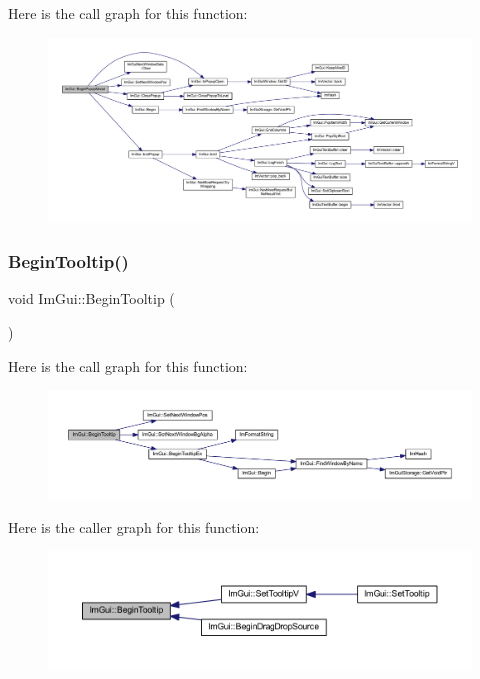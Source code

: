 Here is the call graph for this function\+:
\nopagebreak
\begin{figure}[H]
\begin{center}
\leavevmode
\includegraphics[width=350pt]{namespace_im_gui_a6d840f615c198c2342968f733fda11b3_cgraph}
\end{center}
\end{figure}
\mbox{\label{namespace_im_gui_a36816a48385f4759d746a03cf6202512}} 
\subsubsection{\texorpdfstring{Begin\+Tooltip()}{BeginTooltip()}}
{\footnotesize\ttfamily void Im\+Gui\+::\+Begin\+Tooltip (\begin{DoxyParamCaption}{ }\end{DoxyParamCaption})}

Here is the call graph for this function\+:
\nopagebreak
\begin{figure}[H]
\begin{center}
\leavevmode
\includegraphics[width=350pt]{namespace_im_gui_a36816a48385f4759d746a03cf6202512_cgraph}
\end{center}
\end{figure}
Here is the caller graph for this function\+:
\nopagebreak
\begin{figure}[H]
\begin{center}
\leavevmode
\includegraphics[width=350pt]{namespace_im_gui_a36816a48385f4759d746a03cf6202512_icgraph}
\end{center}
\end{figure}
\mbox{\label{namespace_im_gui_a3189530b7795a9b99169eb95f36c516d}} 
